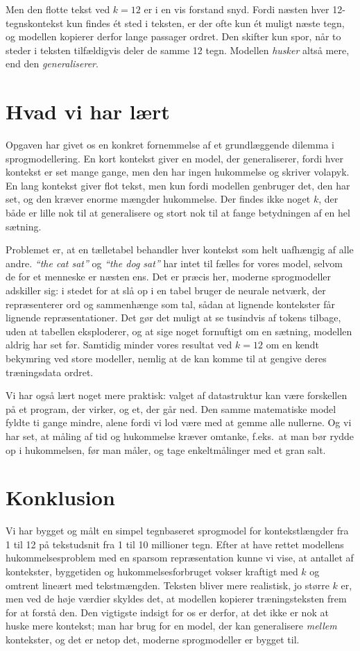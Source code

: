 \documentclass[11pt,a4paper]{article}
\begin{document}
Men den flotte tekst ved $k=12$ er i en vis forstand snyd. Fordi næsten hver
12-tegnskontekst kun findes ét sted i teksten, er der ofte kun ét muligt næste tegn,
og modellen kopierer derfor lange passager ordret. Den skifter kun spor, når to
steder i teksten tilfældigvis deler de samme 12 tegn. Modellen \emph{husker} altså mere,
end den \emph{generaliserer}.

\section{Hvad vi har lært}

Opgaven har givet os en konkret fornemmelse af et grundlæggende dilemma i
sprogmodellering. En kort kontekst giver en model, der generaliserer, fordi hver
kontekst er set mange gange, men den har ingen hukommelse og skriver volapyk. En
lang kontekst giver flot tekst, men kun fordi modellen genbruger det, den har set,
og den kræver enorme mængder hukommelse. Der findes ikke noget $k$, der både er
lille nok til at generalisere og stort nok til at fange betydningen af en hel
sætning.

Problemet er, at en tælletabel behandler hver kontekst som helt uafhængig af alle
andre. \textit{``the cat sat''} og \textit{``the dog sat''} har intet til fælles for
vores model, selvom de for et menneske er næsten ens. Det er præcis her, moderne
sprogmodeller adskiller sig: i stedet for at slå op i en tabel bruger de neurale
netværk, der repræsenterer ord og sammenhænge som tal, sådan at lignende kontekster
får lignende repræsentationer. Det gør det muligt at se tusindvis af tokens tilbage,
uden at tabellen eksploderer, og at sige noget fornuftigt om en sætning, modellen
aldrig har set før. Samtidig minder vores resultat ved $k=12$ om en kendt bekymring
ved store modeller, nemlig at de kan komme til at gengive deres træningsdata ordret.

Vi har også lært noget mere praktisk: valget af datastruktur kan være forskellen på
et program, der virker, og et, der går ned. Den samme matematiske model fyldte ti
gange mindre, alene fordi vi lod være med at gemme alle nullerne. Og vi har set, at
måling af tid og hukommelse kræver omtanke, f.eks.\ at man bør rydde op i
hukommelsen, før man måler, og tage enkeltmålinger med et gran salt.

\section{Konklusion}

Vi har bygget og målt en simpel tegnbaseret sprogmodel for kontekstlængder fra 1 til
12 på tekstudsnit fra 1 til 10 millioner tegn. Efter at have rettet modellens
hukommelsesproblem med en sparsom repræsentation kunne vi vise, at antallet af
kontekster, byggetiden og hukommelsesforbruget vokser kraftigt med $k$ og omtrent
lineært med tekstmængden. Teksten bliver mere realistisk, jo større $k$ er, men ved
de høje værdier skyldes det, at modellen kopierer træningsteksten frem for at forstå
den. Den vigtigste indsigt for os er derfor, at det ikke er nok at huske mere
kontekst; man har brug for en model, der kan generalisere \emph{mellem} kontekster,
og det er netop det, moderne sprogmodeller er bygget til.
\end{document}
